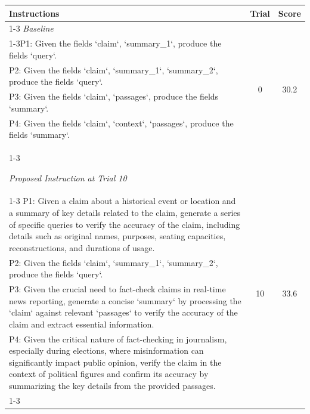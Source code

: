 \begin{table}[ht]
\centering
\footnotesize
\begin{tabularx}{\textwidth}{Xcc}
\hline
\textbf{Instructions} & \textbf{Trial} & \textbf{Score} \\ \hline
\cline{1-3}
\textit{Baseline} \\
\cline{1-3}P1: Given the fields `claim`, `summary\_1`, produce the fields `query`. & \multirow{4}{*}{0} & \multirow{4}{*}{30.2} \\
P2: Given the fields `claim`, `summary\_1`, `summary\_2`, produce the fields `query`. & & \\
P3: Given the fields `claim`, `passages`, produce the fields `summary`. & & \\
P4: Given the fields `claim`, `context`, `passages`, produce the fields `summary`. & & \\
\cline{1-3}

\textit{Proposed Instruction at Trial 10} \\
\cline{1-3}
P1: Given a claim about a historical event or location and a summary of key details related to the claim, generate a series of specific queries to verify the accuracy of the claim, including details such as original names, purposes, seating capacities, reconstructions, and durations of usage. & \multirow{4}{*}{10} & \multirow{4}{*}{33.6} \\
P2: Given the fields `claim`, `summary\_1`, `summary\_2`, produce the fields `query`. & & \\
P3: Given the crucial need to fact-check claims in real-time news reporting, generate a concise `summary` by processing the `claim` against relevant `passages` to verify the accuracy of the claim and extract essential information. & & \\
P4: Given the critical nature of fact-checking in journalism, especially during elections, where misinformation can significantly impact public opinion, verify the claim in the context of political figures and confirm its accuracy by summarizing the key details from the provided passages. & & \\
\cline{1-3}


\end{tabularx}
\end{table}
